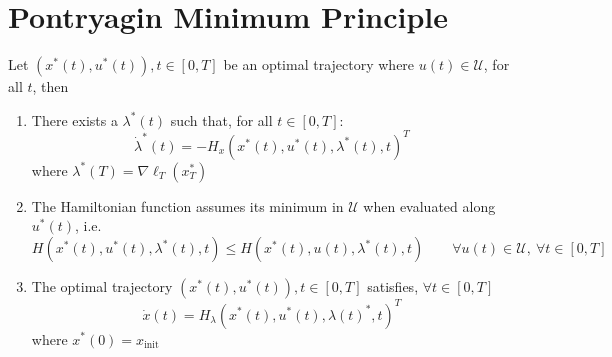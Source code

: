 \documentclass[openany]{book}
\theoremstyle{definition}
\theoremstyle{remark}
\begin{document}
\section{Pontryagin Minimum Principle}
Let $(x^*(t),u^*(t)), t\in[0,T]$ be an optimal trajectory where $u(t)\in\mathcal{U}$, for all $t$, then 
\begin{enumerate}
    \item There exists a $\lambda^*(t)$ such that, for all $t\in[0,T]$:
        \[
            \dot{\lambda}^*(t) = -H_x(x^*(t),u^*(t),\lambda^*(t),t)^T
        \]
        where $\lambda^*(T)=\nabla\ell_T(x_T^*)$
    \item The Hamiltonian function assumes its minimum in $\mathcal{U}$ when evaluated along $u^*(t)$, i.e. 
        \[
            H(x^*(t),u^*(t),\lambda^*(t),t) \leq H(x^*(t),u(t),\lambda^*(t),t) \qquad \forall u(t)\in \mathcal{U},\ \forall t\in[0,T]
        \]
    \item The optimal trajectory $(x^*(t),u^*(t)), t\in[0,T]$ satisfies, $\forall t \in[0,T]$ 
        \[
            \dot{x}(t) = H_\lambda(x^*(t),u^*(t),\lambda(t)^*,t)^T
        \]
        where $x^*(0) = x_{\text{init}}$
\end{enumerate}
\end{document}
